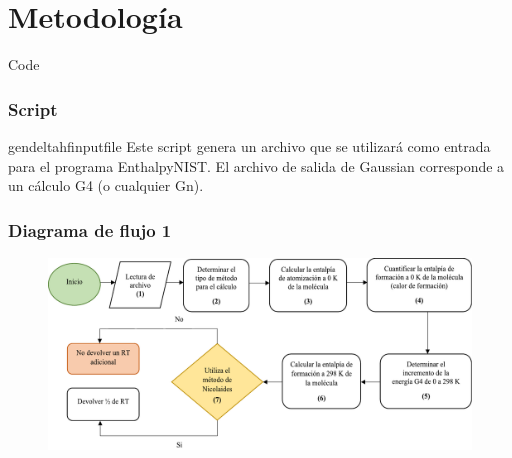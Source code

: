 \documentclass{beamer}
\begin{document}
\section{Metodología}
\begin{frame}[fragile]{Code}
\frametitle{Script}

\begin{block}{gendeltahfinputfile}
Este script genera un archivo que se utilizará como entrada para el programa EnthalpyNIST. El archivo de salida de Gaussian corresponde a un cálculo G4 (o cualquier Gn).
\end{block}
\end{frame}
\begin{frame}
\frametitle{Diagrama de flujo 1}
\begin{center}
\begin{figure}[h!]
\includegraphics[scale=.45]{images/df1}
\end{figure}
\end{center}
\end{frame}
\end{document}

